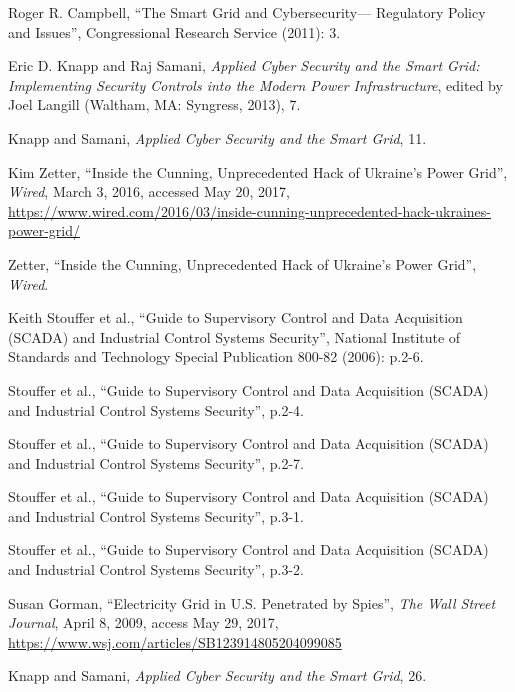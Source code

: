 \documentclass[10pt]{article}
\begin{document}
    \bigskip
    \begin{thebibliography}{9}
    {\small
    Roger R. Campbell,
    ``The Smart Grid and Cybersecurity— 
    Regulatory Policy and Issues'',
    Congressional Research Service
    (2011): 3.
    
    Eric D. Knapp and Raj Samani,
    \textit{Applied Cyber Security and the Smart Grid: Implementing Security Controls into the Modern Power Infrastructure}, edited by Joel Langill (Waltham, MA: Syngress, 2013), 7.
    
    Knapp and Samani,
    \textit{Applied Cyber Security and the Smart Grid}, 11.
    
    Kim Zetter, ``Inside the Cunning, Unprecedented Hack of Ukraine's Power Grid'', \textit{Wired}, March 3, 2016, accessed May 20, 2017, \url{https://www.wired.com/2016/03/inside-cunning-unprecedented-hack-ukraines-power-grid/}
    
    Zetter, ``Inside the Cunning, Unprecedented Hack of Ukraine's Power Grid'', \textit{Wired}.
    
    Keith Stouffer et al., ``Guide to Supervisory Control and Data Acquisition (SCADA) and Industrial Control Systems Security'', National Institute of Standards and Technology Special Publication 800-82 (2006): p.2-6.
    
    Stouffer et al., ``Guide to Supervisory Control and Data Acquisition (SCADA) and Industrial Control Systems Security'', p.2-4.
    
    Stouffer et al., ``Guide to Supervisory Control and Data Acquisition (SCADA) and Industrial Control Systems Security'', p.2-7.
    
    Stouffer et al., ``Guide to Supervisory Control and Data Acquisition (SCADA) and Industrial Control Systems Security'', p.3-1.
    
    Stouffer et al., ``Guide to Supervisory Control and Data Acquisition (SCADA) and Industrial Control Systems Security'', p.3-2.
    
    Susan Gorman, ``Electricity Grid in U.S. Penetrated by Spies'', \textit{The Wall Street Journal}, April 8, 2009, access May 29, 2017, \url{https://www.wsj.com/articles/SB123914805204099085}
    
    Knapp and Samani,
    \textit{Applied Cyber Security and the Smart Grid}, 26.
    
}
\end{thebibliography}
\end{document}
